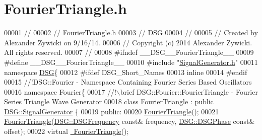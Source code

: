 \hypertarget{_fourier_triangle_8h_source}{\section{Fourier\+Triangle.\+h}
\label{_fourier_triangle_8h_source}
}

\begin{DoxyCode}
00001 \textcolor{comment}{//}
00002 \textcolor{comment}{//  FourierTriangle.h}
00003 \textcolor{comment}{//  DSG}
00004 \textcolor{comment}{//}
00005 \textcolor{comment}{//  Created by Alexander Zywicki on 9/16/14.}
00006 \textcolor{comment}{//  Copyright (c) 2014 Alexander Zywicki. All rights reserved.}
00007 \textcolor{comment}{//}
00008 \textcolor{preprocessor}{#ifndef \_\_DSG\_\_FourierTriangle\_\_}
00009 \textcolor{preprocessor}{#define \_\_DSG\_\_FourierTriangle\_\_}
00010 \textcolor{preprocessor}{#include "\hyperlink{_signal_generator_8h}{SignalGenerator.h}"}
00011 \textcolor{keyword}{namespace }\hyperlink{namespace_d_s_g}{DSG}\{
00012 \textcolor{preprocessor}{#ifdef DSG\_Short\_Names}
00013     \textcolor{keyword}{inline}
00014 \textcolor{preprocessor}{#endif}
00015 \textcolor{comment}{    //!DSG::Fourier - Namespace Containing Fourier Series Based Oscillators}
00016 \textcolor{comment}{}    \textcolor{keyword}{namespace }Fourier\{\textcolor{comment}{}
00017 \textcolor{comment}{        //!\(\backslash\)brief DSG::Fourier::FourierTriangle - Fourier Series Triangle Wave Generator}
\hypertarget{_fourier_triangle_8h_source_l00018}{}\hyperlink{class_d_s_g_1_1_fourier_1_1_fourier_triangle}{00018} \textcolor{comment}{}        \textcolor{keyword}{class }\hyperlink{class_d_s_g_1_1_fourier_1_1_fourier_triangle}{FourierTriangle} : \textcolor{keyword}{public} \hyperlink{class_d_s_g_1_1_signal_generator}{DSG::SignalGenerator} \{
00019         \textcolor{keyword}{public}:
00020             \hyperlink{class_d_s_g_1_1_fourier_1_1_fourier_triangle_a4129c053eddd87256ae39552a06ce329}{FourierTriangle}();
00021             \hyperlink{class_d_s_g_1_1_fourier_1_1_fourier_triangle_a4129c053eddd87256ae39552a06ce329}{FourierTriangle}(\hyperlink{namespace_d_s_g_a4315a061386fa1014fda09b15d3a6973}{DSG::DSGFrequency} \textcolor{keyword}{const}& frequency,
      \hyperlink{namespace_d_s_g_a44431ce1eb0a7300efdd207bc879e52c}{DSG::DSGPhase} \textcolor{keyword}{const}& offset);
00022             \textcolor{keyword}{virtual} \hyperlink{class_d_s_g_1_1_fourier_1_1_fourier_triangle_a780bfb898d144200ff2bfb48849b4d24}{~FourierTriangle}();

\end{DoxyCode}
